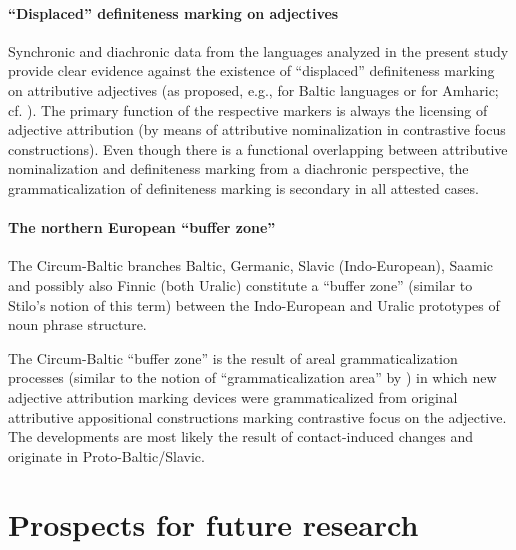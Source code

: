 \paragraph{“Displaced” definiteness marking on adjectives}
Synchronic and diachronic data from the languages analyzed in the present study provide clear evidence against the existence of “displaced” definiteness marking on attributive adjectives (as proposed, e.g., for Baltic languages or for Amharic; cf. \citealt[115]{dahl2007}). The primary function of the respective markers is always the licensing of adjective attribution (by means of attributive nominalization in contrastive focus constructions). Even though there is a functional overlapping between attributive nominalization and definiteness marking from a diachronic perspective, the grammaticalization of definiteness marking is secondary in all attested cases.

\paragraph{The northern European “buffer zone”}
The Circum-Baltic branches Baltic, Germanic, Slavic (Indo-European), Saamic and possibly also Finnic (both Uralic) constitute a “buffer zone” (similar to Stilo's \citeyear{stilo2005} notion of this term) between the Indo-European and Uralic prototypes of noun phrase structure.

The Circum-Baltic “buffer zone” is the result of areal grammaticalization processes (similar to the notion of “grammaticalization area” by \cite{heine-etal2005}) in which new adjective attribution marking devices were grammaticalized from original attributive appositional constructions marking contrastive focus on the adjective. The developments are most likely the result of contact-induced changes and originate in Proto\hyp{}Baltic\slash{}Slavic.

\section{Prospects for future research}
